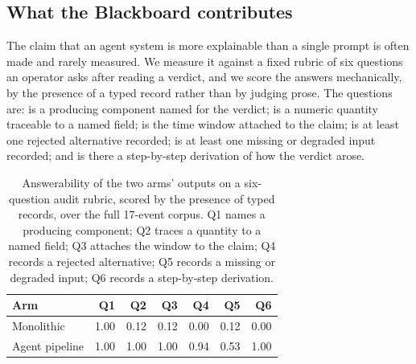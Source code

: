\subsection{What the Blackboard contributes}
\label{sec:agent-explain}

The claim that an agent system is more explainable than a single prompt is
often made and rarely measured. We measure it against a fixed rubric of six
questions an operator asks after reading a verdict, and we score the
answers mechanically, by the presence of a typed record rather than by
judging prose. The questions are: is a producing component named for the
verdict; is a numeric quantity traceable to a named field; is the time
window attached to the claim; is at least one rejected alternative
recorded; is at least one missing or degraded input recorded; and is there
a step-by-step derivation of how the verdict arose.

\begin{table}[t]
\centering
\caption{Answerability of the two arms' outputs on a six-question audit
rubric, scored by the presence of typed records, over the full 17-event
corpus. Q1 names a producing component; Q2 traces a quantity to a named
field; Q3 attaches the window to the claim; Q4 records a rejected
alternative; Q5 records a missing or degraded input; Q6 records a
step-by-step derivation.}
\label{tab:agent-explain}
\small
\setlength{\tabcolsep}{4pt}
\begin{tabular}{@{}lrrrrrr@{}}
\hline
\textbf{Arm} & \textbf{Q1} & \textbf{Q2} & \textbf{Q3} & \textbf{Q4}
  & \textbf{Q5} & \textbf{Q6} \\
\hline
Monolithic     & 1.00 & 0.12 & 0.12 & 0.00 & 0.12 & 0.00 \\
Agent pipeline & 1.00 & 1.00 & 1.00 & 0.94 & 0.53 & 1.00 \\
\hline
\end{tabular}
\end{table}

